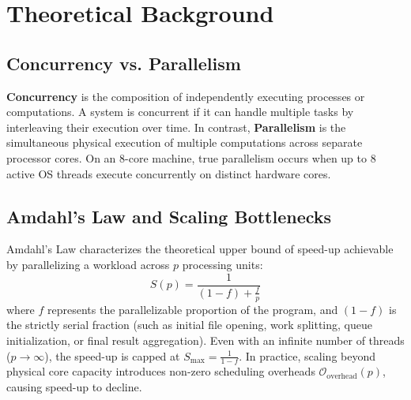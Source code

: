 \documentclass[12pt,a4paper]{article}
\begin{document}
\section{Theoretical Background}

\subsection{Concurrency vs. Parallelism}
\textbf{Concurrency} is the composition of independently executing processes or computations. A system is concurrent if it can handle multiple tasks by interleaving their execution over time. In contrast, \textbf{Parallelism} is the simultaneous physical execution of multiple computations across separate processor cores. 
On an 8-core machine, true parallelism occurs when up to 8 active OS threads execute concurrently on distinct hardware cores.

\subsection{Amdahl's Law and Scaling Bottlenecks}
Amdahl's Law characterizes the theoretical upper bound of speed-up achievable by parallelizing a workload across $p$ processing units:
\begin{equation}
    S(p) = \frac{1}{(1 - f) + \frac{f}{p}}
\end{equation}
where $f$ represents the parallelizable proportion of the program, and $(1 - f)$ is the strictly serial fraction (such as initial file opening, work splitting, queue initialization, or final result aggregation). Even with an infinite number of threads ($p \to \infty$), the speed-up is capped at $S_{\max} = \frac{1}{1 - f}$. In practice, scaling beyond physical core capacity introduces non-zero scheduling overheads $\mathcal{O}_{\text{overhead}}(p)$, causing speed-up to decline.
\end{document}
